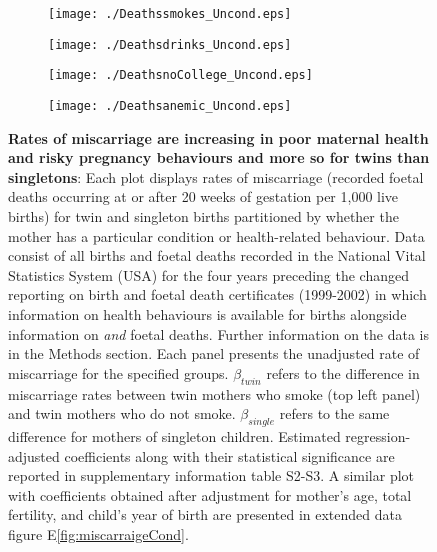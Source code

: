 \documentclass{nature}
\begin{document}
\begin{linenumbers}
\begin{spacing}{1}
\begin{figure}[htpb!]
\begin{subfigure}{.5\textwidth}
  \texttt{[image: ./Deathssmokes\_Uncond.eps]}
\end{subfigure}%
\begin{subfigure}{.5\textwidth}
  \texttt{[image: ./Deathsdrinks\_Uncond.eps]}
\end{subfigure}
\begin{subfigure}{.5\textwidth}
  \texttt{[image: ./DeathsnoCollege\_Uncond.eps]}
\end{subfigure}%
\begin{subfigure}{.5\textwidth}
  \texttt{[image: ./Deathsanemic\_Uncond.eps]}
\end{subfigure}
\vspace{5mm}
\caption{\textbf{Rates of miscarriage are increasing in poor maternal health and risky pregnancy behaviours and more so for twins than singletons}: {\footnotesize Each plot displays rates of miscarriage (recorded foetal deaths occurring at or after 20 weeks of gestation per 1,000 live births) for twin and singleton births partitioned by whether the mother has a particular condition or health-related behaviour. Data consist of all births and foetal deaths recorded in the National Vital Statistics System (USA) for the four years preceding the changed reporting on birth and foetal death certificates (1999-2002) in which information on health behaviours is available for births alongside information on \emph{and} foetal deaths. Further information on the data is in the Methods section. Each panel presents the unadjusted rate of miscarriage for the specified groups. $\beta_{twin}$ refers to the difference in miscarriage rates between twin mothers who smoke (top left panel) and twin mothers who do not smoke. $\beta_{single}$ refers to the same difference for mothers of singleton children. Estimated regression-adjusted coefficients along with their statistical significance are reported in supplementary information table S2-S3. A similar plot with coefficients obtained after adjustment for mother's age, total fertility, and child's year of birth are presented in extended data figure E\ref{fig:miscarraigeCond}.}}
\label{fig:mech}
\end{figure}


\end{spacing}
\end{linenumbers}
\end{document}
